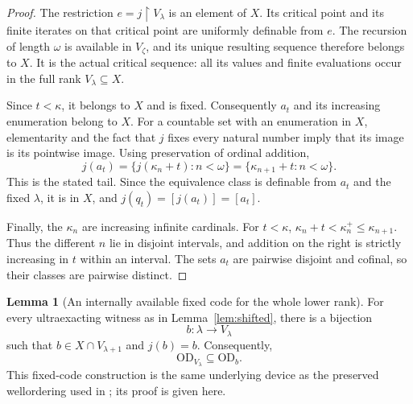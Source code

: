 \documentclass[11pt,letterpaper]{article}
\theoremstyle{definition}
\newtheorem{lemma}[definition]{Lemma}
\newcommand{\OD}{\mathrm{OD}}
\newcommand{\restr}{\mathbin{\upharpoonright}}
\numberwithin{equation}{section}
\begin{document}
\begin{proof}
The restriction $e=j\restr V_\lambda$ is an element of $X$. Its critical
point and its finite iterates on that critical point are uniformly definable
from $e$. The recursion of length $\omega$ is available in $V_\zeta$, and its
unique resulting sequence therefore belongs to $X$. It is the actual critical
sequence: all its values and finite evaluations occur in the full rank
$V_\lambda\subseteq X$.

Since $t<\kappa$, it belongs to $X$ and is fixed. Consequently $a_t$ and its
increasing enumeration belong to $X$. For a countable set with an enumeration
in $X$, elementarity and the fact that $j$ fixes every natural number imply
that its image is its pointwise image. Using preservation of ordinal addition,
\[
 j(a_t)=\{j(\kappa_n+t):n<\omega\}
       =\{\kappa_{n+1}+t:n<\omega\}.
\]
This is the stated tail. Since the equivalence class is definable from
$a_t$ and the fixed $\lambda$, it is in $X$, and
$j(q_t)=[j(a_t)]=[a_t]$.

Finally, the $\kappa_n$ are increasing infinite cardinals. For $t<\kappa$,
$\kappa_n+t<\kappa_n^+\le\kappa_{n+1}$. Thus the different $n$ lie in disjoint
intervals, and addition on the right is strictly increasing in $t$ within an
interval. The sets $a_t$ are pairwise disjoint and cofinal, so their classes
are pairwise distinct.
\end{proof}

\begin{lemma}[An internally available fixed code for the whole lower rank]\label{lem:fixed-code}
For every ultraexacting witness as in Lemma~\ref{lem:shifted}, there is a
bijection
\[
                    b:\lambda\longrightarrow V_\lambda
\]
such that $b\in X\cap V_{\lambda+1}$ and $j(b)=b$. Consequently,
\[
                        \OD_{V_\lambda}\subseteq\OD_b.
\]
This fixed-code construction is the same underlying device as the preserved
wellordering used in \cite[Proposition 3.9]{abgl}; its proof is given here.
\end{lemma}
\end{document}
